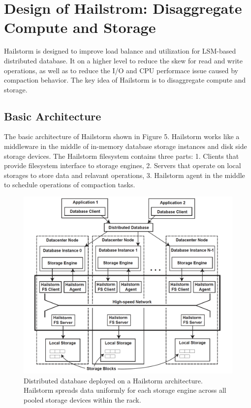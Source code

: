\documentclass[a4paper,10pt,twoside]{article}
\begin{document}
\section{Design of Hailstrom: Disaggregate Compute and Storage}

Hailstorm is designed to improve load balance and utilization for LSM-based distributed database.
It on a higher level to reduce the skew for read and write operations, as well as to reduce the I/O and CPU performace issue caused by compaction behavior.
The key idea of Hailstorm is to disaggregate compute and storage.

\subsection{Basic Architecture}
The basic architecture of Hailstorm shown in Figure 5. 
Hailstorm works like a middleware in the middle of in-memory database storage instances and disk side storage devices.
The Hailstorm filesystem contains three parts:
1. Clients that provide filesystem interface to storage engines,
2. Servers that operate on local storages to store data and relavant operations,
3. Hailstorm agent in the middle to schedule operations of compaction tasks.

\begin{figure}[h]
    \centering
	\includegraphics[scale=0.3]{Hailstorm2.png}
    \caption{ Distributed database deployed on a Hailstorm architecture.
	Hailstorm spreads data uniformly for each storage engine
	across all pooled storage devices within the rack.}
    \label{fig:mesh1}
\end{figure}
\end{document}
